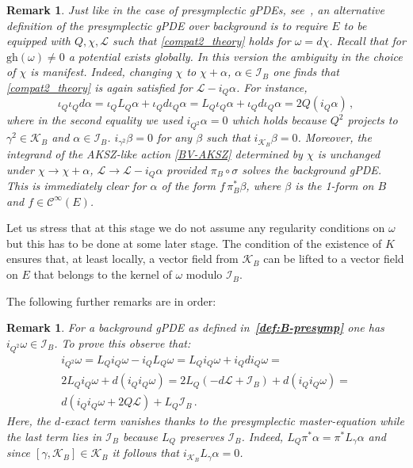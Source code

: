 \documentclass[a4paper,12pt]{article}
\numberwithin{equation}{section} %
\newtheorem{rem}[thm]{Remark}
\newcommand{\bref}[1]{\textbf{\ref{#1}}}
\newcommand{\gh}[1]{\mathrm{gh}(#1)}
\newcommand{\cC}{\mathcal{C}}
\def\cI{\mathcal{I}}
\def\cK{\mathcal{K}}
\def\cL{\mathcal{L}}
\begin{document}
\begin{rem}\label{rem:alt-def-chi}
    Just like in the case of presymplectic gPDEs, see~\cite{Dneprov:2024cvt}, an alternative definition of the presymplectic gPDE over background is to require $E$ to be equipped with $Q,\chi,\cL$ such that \eqref{compat2_theory} holds for $\omega=d\chi$.
Recall that for $\gh{\omega}\neq 0$ a potential exists globally. In this version the ambiguity in the choice 
of $\chi$ is manifest. Indeed,  changing $\chi$ to $\chi+\alpha$, $\alpha \in \cI_{B}$ one finds that \eqref{compat2_theory} is again satisfied for $\cL-i_Q\alpha$. For instance, 
\begin{equation}
\iota_Q \iota_Q d\alpha=\iota_Q L_Q \alpha+\iota_Q d \iota_Q \alpha=
 L_Q \iota_Q\alpha+\iota_Q d \iota_Q \alpha=
2Q(i_Q\alpha)\,,
\end{equation}
where in the second equality we used  $i_{Q^2}\alpha=0$ which holds because $Q^2$ projects to $\gamma^2 \in \cK_B$ and $\alpha \in \cI_B$. $i_{\gamma^2}\beta=0$ for any $\beta$ such that $i_{\cK_B}\beta=0$. Moreover, the integrand of the AKSZ-like action \eqref{BV-AKSZ} determined by $\chi$ is unchanged under $\chi\to  \chi+\alpha$, $\cL\to \cL-i_Q\alpha$ provided $\pi_B\circ \sigma$ solves the background gPDE. This is immediately clear for $\alpha$ of the form $f \, \pi_B^*\beta$, where $\beta$ is the 1-form on $B$ and $f\in \cC^\infty (E)$.
\end{rem}

Let us stress that at this stage we do not assume any regularity conditions on $\omega$ but this has to be done at some later stage. The condition of the existence of ${K}$ ensures that, at least locally, a vector field from $\cK_B$ can be lifted to a vector field on $E$ that belongs to the kernel of $\omega$ modulo $\cI_B$.

The following further remarks are in order:
\begin{rem} For a background gPDE as defined in~\bref{def:B-presymp} one has $i_{Q^2}\omega \in \cI_B$. To prove this observe that:
\begin{multline}
    i_{Q^2}\omega = L_Qi_Q\omega - i_QL_Q\omega = L_Qi_Q\omega + i_Q d i_Q \omega = \\ 2L_Q i_Q\omega + d(i_Q i_Q \omega) = 2L_Q(-d\cL + \cI_B) +  d(i_Q i_Q \omega) =\\ d(i_Q i_Q \omega + 2Q\cL) + L_Q \cI_B\,.
\end{multline}
Here, the $d$-exact term vanishes thanks to the presymplectic master-equation while the last term lies in $\cI_B$ because $L_Q$ preserves $\cI_B$. Indeed, $L_Q \pi^* \alpha = \pi^*L_\gamma \alpha$ and since $[\gamma,\cK_B] \in \cK_B$ it follows that $i_{\cK_B}L_\gamma\alpha = 0$.
\end{rem}
\end{document}
